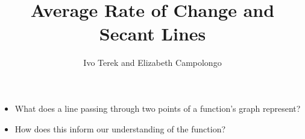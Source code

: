 \documentclass{ximera}
\author{Ivo Terek and Elizabeth Campolongo}
\title{Average Rate of Change and Secant Lines}
\begin{document}
\begin{abstract}
\end{abstract}
\maketitle
%
%
%
\begin{motivatingQuestions}\begin{itemize}
\item What does a line passing through two points of a function's graph represent?
\item How does this inform our understanding of the function?
\end{itemize}\end{motivatingQuestions}
%
%
%
\end{document}
